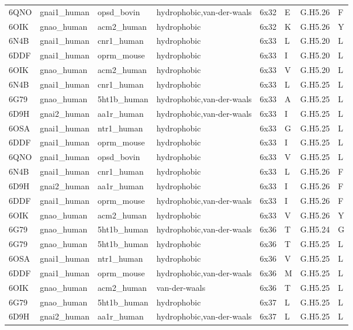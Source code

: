 \begin{landscape}
\begin{longtable}{llllllll}
\addlinespace
6QNO & gnai1\_human & opsd\_bovin & hydrophobic,van-der-waals & 6x32 & E & G.H5.26 & F\\
6OIK & gnao\_human & acm2\_human & hydrophobic & 6x32 & K & G.H5.26 & Y\\
6N4B & gnai1\_human & cnr1\_human & hydrophobic & 6x33 & L & G.H5.20 & L\\
6DDF & gnai1\_human & oprm\_mouse & hydrophobic & 6x33 & I & G.H5.20 & L\\
6OIK & gnao\_human & acm2\_human & hydrophobic & 6x33 & V & G.H5.20 & L\\
\addlinespace
6N4B & gnai1\_human & cnr1\_human & hydrophobic & 6x33 & L & G.H5.25 & L\\
6G79 & gnao\_human & 5ht1b\_human & hydrophobic,van-der-waals & 6x33 & A & G.H5.25 & L\\
6D9H & gnai2\_human & aa1r\_human & hydrophobic,van-der-waals & 6x33 & I & G.H5.25 & L\\
6OSA & gnai1\_human & ntr1\_human & hydrophobic & 6x33 & G & G.H5.25 & L\\
6DDF & gnai1\_human & oprm\_mouse & hydrophobic & 6x33 & I & G.H5.25 & L\\
\addlinespace
6QNO & gnai1\_human & opsd\_bovin & hydrophobic & 6x33 & V & G.H5.25 & L\\
6N4B & gnai1\_human & cnr1\_human & hydrophobic & 6x33 & L & G.H5.26 & F\\
6D9H & gnai2\_human & aa1r\_human & hydrophobic & 6x33 & I & G.H5.26 & F\\
6DDF & gnai1\_human & oprm\_mouse & hydrophobic,van-der-waals & 6x33 & I & G.H5.26 & F\\
6OIK & gnao\_human & acm2\_human & hydrophobic & 6x33 & V & G.H5.26 & Y\\
\addlinespace
6G79 & gnao\_human & 5ht1b\_human & hydrophobic,van-der-waals & 6x36 & T & G.H5.24 & G\\
6G79 & gnao\_human & 5ht1b\_human & hydrophobic & 6x36 & T & G.H5.25 & L\\
6OSA & gnai1\_human & ntr1\_human & hydrophobic & 6x36 & V & G.H5.25 & L\\
6DDF & gnai1\_human & oprm\_mouse & hydrophobic,van-der-waals & 6x36 & M & G.H5.25 & L\\
6OIK & gnao\_human & acm2\_human & van-der-waals & 6x36 & T & G.H5.25 & L\\
\addlinespace
6G79 & gnao\_human & 5ht1b\_human & hydrophobic & 6x37 & L & G.H5.25 & L\\
6D9H & gnai2\_human & aa1r\_human & hydrophobic,van-der-waals & 6x37 & L & G.H5.25 & L\\

\end{longtable}
\end{landscape}
